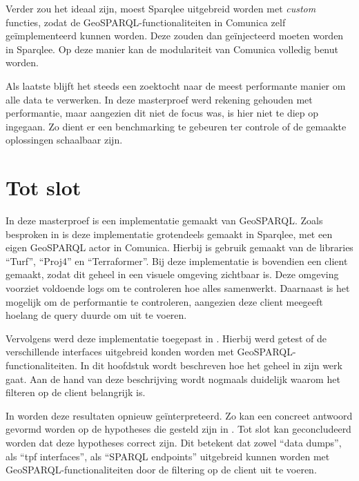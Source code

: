 Verder zou het ideaal zijn, moest Sparqlee uitgebreid worden met \textit{custom} functies, zodat de GeoSPARQL-functionaliteiten in Comunica zelf geïmplementeerd kunnen worden. Deze zouden dan geïnjecteerd moeten worden in Sparqlee. Op deze manier kan de modulariteit van Comunica volledig benut worden.

Als laatste blijft het steeds een zoektocht naar de meest performante manier om alle data te verwerken. In deze masterproef werd rekening gehouden met performantie, maar aangezien dit niet de focus was, is hier niet te diep op ingegaan. Zo dient er een benchmarking te gebeuren ter controle of de gemaakte oplossingen schaalbaar zijn.

\section{Tot slot}
In deze masterproef is een implementatie gemaakt van GeoSPARQL. Zoals besproken in  is deze implementatie grotendeels gemaakt in Sparqlee, met een eigen GeoSPARQL actor in Comunica. Hierbij is gebruik gemaakt van de libraries ``Turf'', ``Proj4'' en ``Terraformer''. Bij deze implementatie is bovendien een client gemaakt, zodat dit geheel in een visuele omgeving zichtbaar is. Deze omgeving voorziet voldoende logs om te controleren hoe alles samenwerkt. Daarnaast is het mogelijk om de performantie te controleren, aangezien deze client meegeeft hoelang de query duurde om uit te voeren. 

Vervolgens werd deze implementatie toegepast in . Hierbij werd getest of de verschillende interfaces uitgebreid konden worden met GeoSPARQL-functionaliteiten. In dit hoofdstuk wordt beschreven hoe het geheel in zijn werk gaat. Aan de hand van deze beschrijving wordt nogmaals duidelijk waarom het filteren op de client belangrijk is. 

In  worden deze resultaten opnieuw geïnterpreteerd. Zo kan een concreet antwoord gevormd worden op de hypotheses die gesteld zijn in . Tot slot kan geconcludeerd worden dat deze hypotheses correct zijn. Dit betekent dat zowel ``data dumps'', als ``\acrshort{tpf} interfaces'', als ``SPARQL endpoints'' uitgebreid kunnen worden met GeoSPARQL-functionaliteiten door de filtering op de client uit te voeren.
